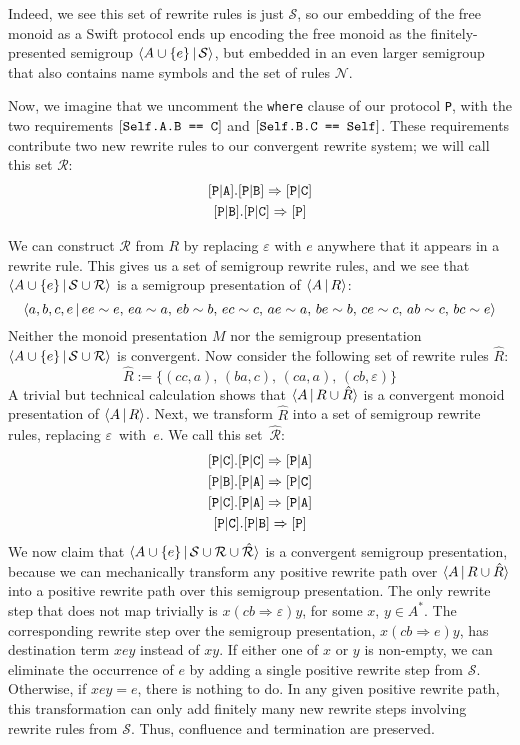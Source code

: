 \documentclass[../generics]{subfiles}
\begin{document}
\begin{example}
Indeed, we see this set of rewrite rules is just $\mathcal{S}$, so our embedding of the free monoid as a Swift protocol ends up encoding the free monoid as the finitely-presented semigroup $\langle A\cup\{e\}\,|\,\mathcal{S}\rangle$, but embedded in an even larger semigroup that also contains name symbols and the set of rules $\mathcal{N}$.

Now, we imagine that we uncomment the \texttt{where} clause of our protocol \texttt{P}, with the two requirements $[\texttt{Self.A.B == C}]$ and $[\texttt{Self.B.C == Self}]$. These requirements contribute two new rewrite rules to our convergent rewrite system; we will call this set $\mathcal{R}$:
\begin{gather*}
\assocsym{P}{A}.\assocsym{P}{B}\Rightarrow\assocsym{P}{C}\\
\assocsym{P}{B}.\assocsym{P}{C}\Rightarrow\protosym{P}
\end{gather*}

We can construct $\mathcal{R}$ from $R$ by replacing $\varepsilon$ with $e$ anywhere that it appears in a rewrite rule. This gives us a set of semigroup rewrite rules, and we see that $\langle A\cup\{e\}\,|\, \mathcal{S}\cup\mathcal{R}\rangle$ is a semigroup presentation of $\langle A\,|\,R\rangle$:
\[\langle a,b,c,e\,|\,ee\sim e,\,ea\sim a,\,eb\sim b,\,ec\sim c,\,ae\sim a,\,be\sim b,\,ce\sim c,\,ab\sim c,\,bc\sim e\rangle\]
Neither the monoid presentation $M$ nor the semigroup presentation $\langle A\cup\{e\}\,|\,\mathcal{S}\cup\mathcal{R}\rangle$ is convergent. Now consider the following set of rewrite rules $\hat{R}$:
\[\hat{R} := \{(cc,a),\,(ba,c),\,(ca,a),\,(cb,\varepsilon)\}\]
A trivial but technical calculation shows that $\langle A\,|\,R\cup\hat{R}\rangle$ is a convergent monoid presentation of $\langle A\,|\,R\rangle$. Next, we transform $\hat{R}$ into a set of semigroup rewrite rules, replacing $\varepsilon$~with~$e$. We call this set~$\hat{\mathcal{R}}$:
\begin{gather*}
\assocsym{P}{C}.\assocsym{P}{C}\Rightarrow\assocsym{P}{A}\\
\assocsym{P}{B}.\assocsym{P}{A}\Rightarrow\assocsym{P}{C}\\
\assocsym{P}{C}.\assocsym{P}{A}\Rightarrow\assocsym{P}{A}\\
\assocsym{P}{C}.\assocsym{P}{B}\Rightarrow\protosym{P}
\end{gather*}
We now claim that $\langle A\cup\{e\}\,|\,\mathcal{S}\cup\mathcal{R}\cup\hat{\mathcal{R}}\rangle$ is a convergent semigroup presentation, because we can mechanically transform any positive rewrite path over $\langle A\,|\,R\cup\hat{R}\rangle$ into a positive rewrite path over this semigroup presentation. The only rewrite step that does not map trivially is $x(cb\Rightarrow\varepsilon)y$, for some $x$, $y\in A^*$. The corresponding rewrite step over the semigroup presentation, $x(cb\Rightarrow e)y$, has destination term $xey$ instead of $xy$. If either one of $x$ or $y$ is non-empty, we can eliminate the occurrence of $e$ by adding a single positive rewrite step from $\mathcal{S}$. Otherwise, if $xey=e$, there is nothing to do. In any given positive rewrite path, this transformation can only add finitely many new rewrite steps involving rewrite rules from $\mathcal{S}$. Thus, confluence and termination are preserved.


\end{example}
\end{document}
